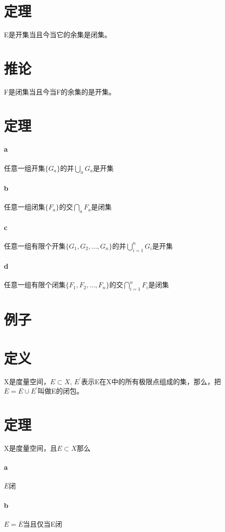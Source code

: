 \section{定理} E是开集当且今当它的余集是闭集。
\section*{推论} F是闭集当且今当F的余集的是开集。
\section{定理}
\paragraph{a} 任意一组开集$\{ G_a \}$的并$ \bigcup_aG_a $是开集
\paragraph{b} 任意一组闭集$\{ F_a \}$的交$ \bigcap_aF_a $是闭集
\paragraph{c} 任意一组有限个开集$\{ G_1, G_2, ..., G_n \}$的并$ \bigcup_{i=1}^nG_i $是开集
\paragraph{d} 任意一组有限个闭集$\{ F_1, F_2, ..., F_n \}$的交$ \bigcap_{i=1}^nF_i $是闭集
\section{例子}
\section{定义} X是度量空间，$ E \subset X $, $ E^{'} $表示E在X中的所有极限点组成的集，那么，把$ \overline{E} = E \cup E^{'} $叫做E的闭包。
\section{定理} X是度量空间，且$ E \subset X $那么
\paragraph{a} $\overline{E}$闭
\paragraph{b} $E = \overline{E}$当且仅当E闭
